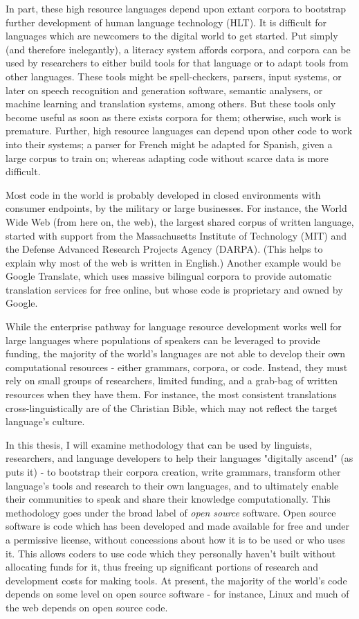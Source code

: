 In part, these high resource languages depend upon extant corpora to bootstrap further development of human language technology (HLT). It is difficult for languages which are newcomers to the digital world to get started. %
Put simply (and therefore inelegantly), a literacy system affords corpora, and corpora can be used by researchers to either build tools for that language or to adapt tools from other languages. These tools might be spell-checkers, parsers, input systems, or later on speech recognition and generation software, semantic analysers, or machine learning and translation systems, among others. But these tools only become useful as soon as there exists corpora for them; otherwise, such work is premature. Further, high resource languages can depend upon other code to work into their systems; a parser for French might be adapted for Spanish, given a large corpus to train on; whereas adapting code without scarce data is more difficult.

Most code in the world is probably developed in closed environments with consumer endpoints, by the military or large businesses. For instance, the World Wide Web (from here on, the web), the largest shared corpus of written language, started with support from  the Massachusetts Institute of Technology (MIT) and the Defense Advanced Research Projects Agency (DARPA). (This helps to explain why most of the web is written in English.) Another example would be Google Translate, which uses massive bilingual corpora to provide automatic translation services for free online, but whose code is proprietary and owned by Google.

While the enterprise pathway for language resource development works well for large languages where populations of speakers can be leveraged to provide funding, the majority of the world's languages are not able to develop their own computational resources - either grammars, corpora, or code. Instead, they must rely on small groups of researchers, limited funding, and a grab-bag of written resources when they have them. For instance, the most consistent translations cross-linguistically are of the Christian Bible, which may not reflect the target language's culture.

In this thesis, I will examine methodology that can be used by linguists, researchers, and language developers to help their languages "digitally ascend" (as \citet{kornai2013digital} puts it) - to bootstrap their corpora creation, write grammars, transform other language's tools and research to their own languages, and to ultimately enable their communities to speak and share their knowledge computationally. This methodology goes under the broad label of \textit{open source} software. Open source software is code which has been developed and made available for free and under a permissive license, without concessions about how it is to be used or who uses it. This allows coders to use code which they personally haven't built without allocating funds for it, thus freeing up significant portions of research and development costs for making tools. At present, the majority of the world's code depends on some level on open source software - for instance, Linux and much of the web depends on open source code.

